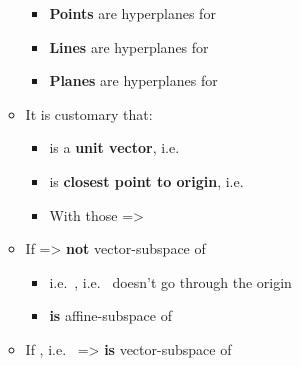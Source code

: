 \begin{itemize}
\begin{itemize}
\begin{itemize}
                  \item
                        \textbf{Points} are hyperplanes for 
                  \item
                        \textbf{Lines} are hyperplanes for 
                  \item
                        \textbf{Planes} are hyperplanes for 
                \end{itemize}
          \item
                It is customary that:

                \begin{itemize}

                  \item
                         is a \textbf{unit vector},
                        i.e.~
                  \item
                         is \textbf{closest point to origin},
                        i.e.~
                  \item
                        With those =\textgreater{}
                \end{itemize}
          \item
                If 
                =\textgreater{}  \textbf{not} vector-subspace of

                \begin{itemize}

                  \item
                        i.e.~, i.e.~ doesn't go
                        through the origin
                  \item
                         \textbf{is} affine-subspace of 
                \end{itemize}
          \item
                If ,
                i.e.~ =\textgreater{}
                 \textbf{is} vector-subspace of 


\end{itemize}
\end{itemize}
